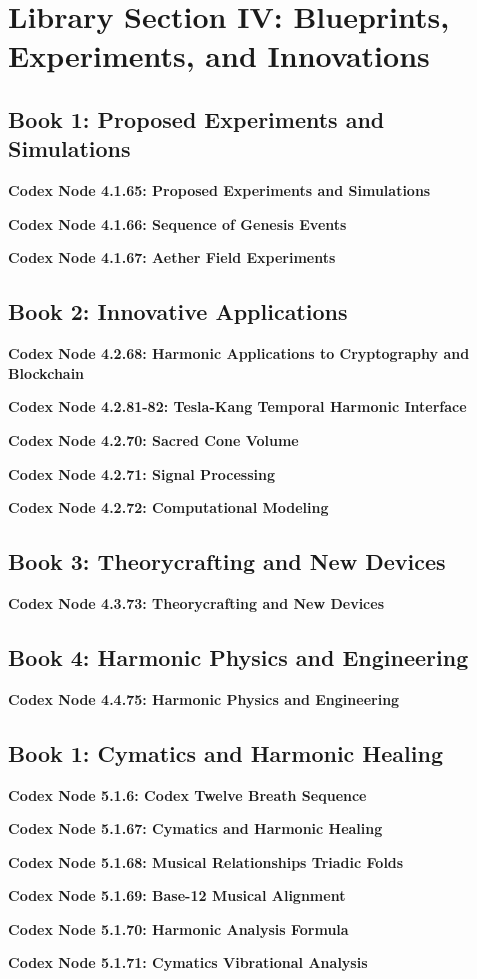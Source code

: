 \documentclass[a4paper,12pt]{book}
\newcommand{\codexnode}[5]{%
  \par\vspace{0.5em}%
  \noindent\textbf{Codex Node #1.#2.#3: #5}\label{#4}%
  \par\vspace{0.5em}%
}
\begin{document}

\section{Library Section IV: Blueprints, Experiments, and Innovations}

\subsection{Book 1: Proposed Experiments and Simulations}
\codexnode{4}{1}{65}{section4/book1/chapter1_proposed_experiments_and_simulations}{Proposed Experiments and Simulations}
\codexnode{4}{1}{66}{section4/book1/chapter1_sequence_of_genesis_events}{Sequence of Genesis Events}
\codexnode{4}{1}{67}{section4/book1/codex_aether_field_experiments}{Aether Field Experiments}

\subsection{Book 2: Innovative Applications}
\codexnode{4}{2}{68}{section4/book2/chapter2_harmonic_applications_cryptography_blockchain}{Harmonic Applications to Cryptography and Blockchain}
\codexnode{4}{2}{81-82}{section4/book2/codex_tesla_kang}{Tesla-Kang Temporal Harmonic Interface}
\codexnode{4}{2}{70}{section4/book2/chapter2_sacred_cone_volume}{Sacred Cone Volume}
\codexnode{4}{2}{71}{section4/book2/chapter2_signal_processing}{Signal Processing}
\codexnode{4}{2}{72}{section4/book2/chapter2_computational_modeling}{Computational Modeling}

\subsection{Book 3: Theorycrafting and New Devices}
\codexnode{4}{3}{73}{section4/book3/chapter3_theorycrafting_and_new_devices}{Theorycrafting and New Devices}
\subsection{Book 4: Harmonic Physics and Engineering}
\codexnode{4}{4}{75}{chapter4_harmonic_physics_and_engineering}{Harmonic Physics and Engineering}




\subsection{Book 1: Cymatics and Harmonic Healing}
\codexnode{5}{1}{6}{section5/book1/codex_twelve_breath_sequence}{Codex Twelve Breath Sequence}
\codexnode{5}{1}{67}{section5/book1/chapter1_cymatics_and_harmonic_healing}{Cymatics and Harmonic Healing}
\codexnode{5}{1}{68}{section5/book1/chapter1_musical_relationships_triadic_folds}{Musical Relationships Triadic Folds}
\codexnode{5}{1}{69}{section5/book1/chapter1_base_12_musical_alignment}{Base-12 Musical Alignment}
\codexnode{5}{1}{70}{section5/book1/chapter1_harmonic_analysis_formula}{Harmonic Analysis Formula}
\codexnode{5}{1}{71}{section5/book1/chapter1_cymatics_vibrational_analysis}{Cymatics Vibrational Analysis}
\end{document}
